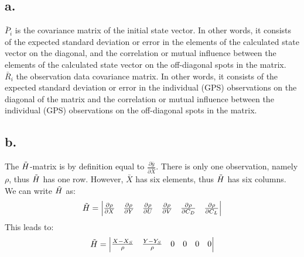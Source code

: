 \documentclass[a4paper,10pt,titlepage]{article}
\begin{document}
\subsection*{a.}
$\bar{P}_i$ is the covariance matrix of the initial state vector. In other words, it consists of the expected standard deviation or error in the elements of the calculated state vector on the diagonal, and the correlation or mutual influence between the elements of the calculated state vector on the off-diagonal spots in the matrix. \\
$\bar{R}_i$ the observation data covariance matrix. In other words, it consists of the expected standard deviation or error in the individual (GPS) observations on the diagonal of the matrix and the correlation or mutual influence between the individual (GPS) observations on the off-diagonal spots in the matrix.
\subsection*{b.}
The $\Tilde{H}$-matrix is by definition equal to $\frac{\partial \bar{y}}{\partial \bar{X}}$. There is only one observation, namely $\rho$, thus $\Tilde{H}$ has one row. However, $\bar{X}$ has six elements, thus $\Tilde{H}$ has six columns. We can write $\Tilde{H}$ as:
\begin{equation*}
    \Tilde{H} = \begin{vmatrix}
    \frac{\partial \rho}{\partial X} & \frac{\partial \rho}{\partial Y} & \frac{\partial \rho}{\partial U} & \frac{\partial \rho}{\partial V} & \frac{\partial \rho}{\partial C_D} & \frac{\partial \rho}{\partial C_L}  \\
\end{vmatrix}
\end{equation*}
This leads to:
\begin{equation*}
    \Tilde{H} = \begin{vmatrix}
    \frac{X - X_S}{\rho} & \frac{Y - Y_S}{\rho} & 0 & 0 & 0 & 0  \\
\end{vmatrix}
\end{equation*}
\end{document}

